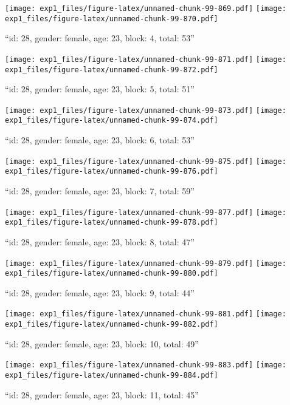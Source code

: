 \documentclass[,]{article}
\begin{document}
\texttt{[image: exp1\_files/figure-latex/unnamed-chunk-99-869.pdf]}
\texttt{[image: exp1\_files/figure-latex/unnamed-chunk-99-870.pdf]}

\newpage
[1] 

``id: 28, gender: female, age: 23, block: 4, total: 53''

\texttt{[image: exp1\_files/figure-latex/unnamed-chunk-99-871.pdf]}
\texttt{[image: exp1\_files/figure-latex/unnamed-chunk-99-872.pdf]}

\newpage
[1] 

``id: 28, gender: female, age: 23, block: 5, total: 51''

\texttt{[image: exp1\_files/figure-latex/unnamed-chunk-99-873.pdf]}
\texttt{[image: exp1\_files/figure-latex/unnamed-chunk-99-874.pdf]}

\newpage
[1] 

``id: 28, gender: female, age: 23, block: 6, total: 53''

\texttt{[image: exp1\_files/figure-latex/unnamed-chunk-99-875.pdf]}
\texttt{[image: exp1\_files/figure-latex/unnamed-chunk-99-876.pdf]}

\newpage
[1] 

``id: 28, gender: female, age: 23, block: 7, total: 59''

\texttt{[image: exp1\_files/figure-latex/unnamed-chunk-99-877.pdf]}
\texttt{[image: exp1\_files/figure-latex/unnamed-chunk-99-878.pdf]}

\newpage
[1] 

``id: 28, gender: female, age: 23, block: 8, total: 47''

\texttt{[image: exp1\_files/figure-latex/unnamed-chunk-99-879.pdf]}
\texttt{[image: exp1\_files/figure-latex/unnamed-chunk-99-880.pdf]}

\newpage
[1] 

``id: 28, gender: female, age: 23, block: 9, total: 44''

\texttt{[image: exp1\_files/figure-latex/unnamed-chunk-99-881.pdf]}
\texttt{[image: exp1\_files/figure-latex/unnamed-chunk-99-882.pdf]}

\newpage
[1] 

``id: 28, gender: female, age: 23, block: 10, total: 49''

\texttt{[image: exp1\_files/figure-latex/unnamed-chunk-99-883.pdf]}
\texttt{[image: exp1\_files/figure-latex/unnamed-chunk-99-884.pdf]}

\newpage
[1] 

``id: 28, gender: female, age: 23, block: 11, total: 45''
\end{document}
